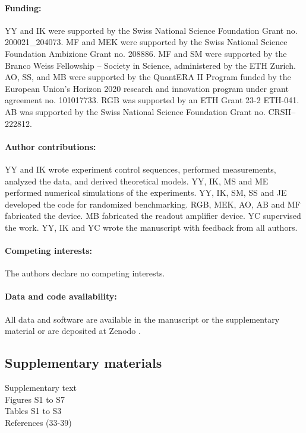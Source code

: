 \documentclass[12pt]{article}
\begin{document}
\paragraph*{Funding:}
YY and IK were supported by the Swiss National Science Foundation Grant no. 200021\_204073. MF and MEK were supported by the Swiss National Science Foundation Ambizione Grant no. 208886. MF and SM were supported by the Branco Weiss Fellowship – Society in Science, administered by the ETH Zurich. AO, SS, and MB were supported by the QuantERA II Program funded by the European Union's Horizon 2020
research and innovation program under grant agreement no. 101017733. RGB was supported by an ETH Grant 23-2 ETH-041. AB was supported by the Swiss National Science Foundation Grant no. CRSII--222812.
\paragraph*{Author contributions:}
YY and IK wrote experiment control sequences, performed measurements, analyzed the data, and derived theoretical models. YY, IK, MS and ME performed numerical simulations of the experiments. YY, IK, SM, SS and JE developed the code for randomized benchmarking. RGB, MEK, AO, AB and MF fabricated the device. MB fabricated the readout amplifier device. YC supervised the work. YY, IK and YC wrote the manuscript with feedback from all authors.
\paragraph*{Competing interests:} The authors declare no competing interests.
\paragraph*{Data and code availability:} All data and software are available in the manuscript or the supplementary material or are deposited at Zenodo \cite{dataset}.



\subsection*{Supplementary materials}
Supplementary text\\
Figures S1 to S7\\
Tables S1 to S3\\
References (33-39)



\newpage
\end{document}
